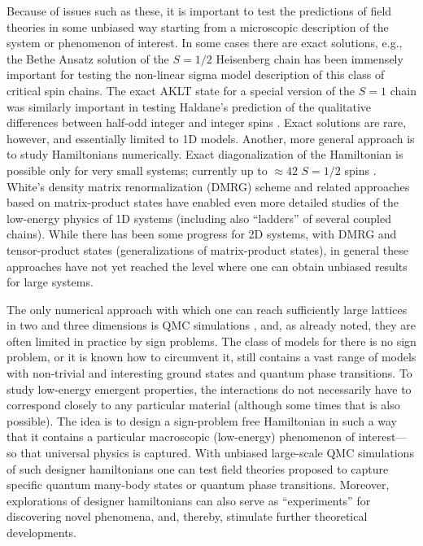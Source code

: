 \documentclass[range]{ar2e}
\begin{document}
Because of issues such as these, it is important to test the predictions of field theories in some unbiased way
starting from a microscopic description of the system or phenomenon of interest. In some cases there are exact solutions, 
e.g., the Bethe Ansatz solution of the $S=1/2$ Heisenberg chain \cite{Bethe31} has been immensely important for testing 
the non-linear sigma model description of this class of critical spin chains. The exact AKLT state \cite{affleck88} for a special 
version of the $S=1$ chain was similarly important in testing Haldane's prediction of the qualitative differences between 
half-odd integer and integer spins \cite{Haldane83}. Exact solutions are rare, however, and essentially limited to 1D models. 
Another, more general approach is to study Hamiltonians numerically. Exact diagonalization of the Hamiltonian is possible 
only for very small systems; currently up to $\approx 42$ $S=1/2$ spins \cite{Nakano11,Lauchli11}. White's density matrix 
renormalization (DMRG) scheme \cite{White92} and related approaches based on matrix-product states \cite{Schollwock05} 
have enabled even more detailed studies of the low-energy physics of 1D systems (including also ``ladders'' of several 
coupled chains). While there has been some progress for 2D systems, with DMRG \cite{Stoudenmire12} and tensor-product 
\cite{Murg09} states (generalizations of matrix-product states), in general these approaches have not yet reached the 
level where one can obtain unbiased results for large systems.

The only numerical approach with which one can reach sufficiently large lattices in two and three dimensions is QMC 
simulations \cite{Evertz03,Sandvik10b}, and, as already noted, they are often limited in practice by sign problems. The 
class of models for there is no sign problem, or it is known how to circumvent it, still contains a vast range of 
models with non-trivial and interesting ground states and quantum phase transitions. To study low-energy emergent 
properties, the interactions do not necessarily have to correspond closely to any particular material (although some 
times that is also possible). The idea is to design a sign-problem free Hamiltonian in such a way that it contains a 
particular macroscopic (low-energy) phenomenon of interest---so that universal physics is captured. With unbiased large-scale 
QMC simulations of such designer hamiltonians one can test field theories proposed to capture specific quantum many-body 
states or quantum phase transitions. Moreover, explorations of designer hamiltonians can also serve as ``experiments'' 
for discovering novel phenomena, and, thereby, stimulate further theoretical developments.
\end{document}
